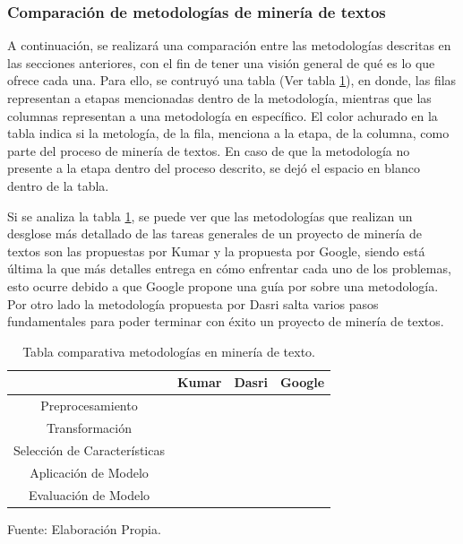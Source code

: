 \subsubsection{Comparación de metodologías de minería de textos}
    A continuación, se realizará una comparación entre las metodologías descritas en las secciones anteriores, con el fin de tener una visión general de qué es lo que ofrece cada una. Para ello, se contruyó una tabla (Ver tabla \ref{table:comparación_metodologías_tm}), en donde, las filas representan a etapas mencionadas dentro de la metodología, mientras que las columnas representan a una metodología en específico. El color achurado en la tabla indica si la metología, de la fila, menciona a la etapa, de la columna, como parte del proceso de minería de textos. En caso de que la metodología no presente a la etapa dentro del proceso descrito, se dejó el espacio en blanco dentro de la tabla.
    
    Si se analiza la tabla \ref{table:comparación_metodologías_tm}, se puede ver que las metodologías que realizan un desglose más detallado de las tareas generales de un proyecto de minería de textos son las propuestas por Kumar y la propuesta por Google, siendo está última la que más detalles entrega en cómo enfrentar cada uno de los problemas, esto ocurre debido a que Google propone una guía por sobre una metodología. Por otro lado la metodología propuesta por Dasri salta varios pasos fundamentales para poder terminar con éxito un proyecto de minería de textos.

    \begin{table}[H]
    \centering
    \begin{tabular}{c|c|c|c|}
    \cline{2-4}
                                                       & Kumar                    & Dasri                    & Google                   \\ \hline
    \multicolumn{1}{|c|}{Preprocesamiento}             & \cellcolor[HTML]{DAE8FC} & \cellcolor[HTML]{DAE8FC} & \cellcolor[HTML]{DAE8FC} \\ \hline
    \multicolumn{1}{|c|}{Transformación}               & \cellcolor[HTML]{DAE8FC} &                          & \cellcolor[HTML]{DAE8FC} \\ \hline
    \multicolumn{1}{|c|}{Selección de Características} & \cellcolor[HTML]{DAE8FC} &                          & \cellcolor[HTML]{DAE8FC} \\ \hline
    \multicolumn{1}{|c|}{Aplicación de Modelo}         & \cellcolor[HTML]{DAE8FC} & \cellcolor[HTML]{DAE8FC} & \cellcolor[HTML]{DAE8FC} \\ \hline
    \multicolumn{1}{|c|}{Evaluación de Modelo}         & \cellcolor[HTML]{DAE8FC} & \cellcolor[HTML]{DAE8FC} & \cellcolor[HTML]{DAE8FC} \\ \hline
    \end{tabular}
    \caption{\label{table:comparación_metodologías_tm} Tabla comparativa metodologías en minería de texto.} Fuente: Elaboración Propia.
    \end{table}
    
